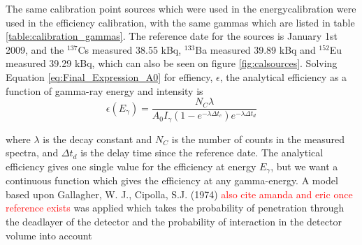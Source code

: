 The same calibration point sources which were used in the energycalibration were used in the efficiency calibration, with the same gammas which are listed in table \ref{table:calibration_gammas}. The reference date for the sources is January 1st 2009, and the $^{137}$Cs measured 38.55 kBq, $^{133}$Ba measured 39.89 kBq and $^{152}$Eu measured 39.29 kBq, which can also be seen on figure \ref{fig:calsources}. \noindent Solving Equation \ref{eq:Final_Expression_A0} for effiency, $\epsilon$, the analytical efficiency as a function of gamma-ray energy and intensity is 
\begin{equation} \label{eq:efficiency_analytical}
    \epsilon(E_\gamma)= \frac{N_C \lambda}{A_0 I_\gamma (1-e^{-\lambda \Delta t_c})e^{-\lambda\Delta t_d}}
\end{equation}

\noindent 
where $\lambda$ is the decay constant and $N_C$ is the number of counts in the measured spectra, and $\Delta t_d$ is the delay time since the reference date. The analytical efficiency gives one single value for the efficiency at energy $E_\gamma$, but we want a continuous function which gives the efficiency at any gamma-energy. A model based upon Gallagher, W. J., Cipolla, S.J. (1974)\cite{Gallagher1974b} \textcolor{red}{also cite amanda and eric once reference exists} was applied which takes the probability of penetration through the deadlayer of the detector and the probability of interaction in the detector volume into account

